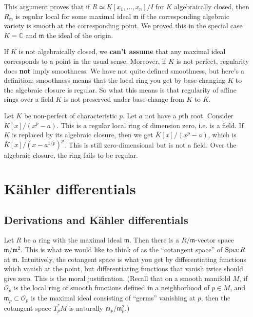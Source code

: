 \begin{remark}[Warning] This argument proves that if $R \simeq K[x_1, \dots,
x_n]/I$ for $K$ algebraically closed, then $R_{\mathfrak{m}}$ is regular local for some maximal ideal
$\mathfrak{m}$ if the corresponding algebraic variety is smooth at the
corresponding point. We proved this in the special case $K  = \mathbb{C}$ and
$\mathfrak{m}$ the ideal of the origin.

If $K$ is not algebraically closed, we \textbf{can't assume} that any maximal
ideal corresponds to a point in the usual sense. Moreover, if $K$ is not
perfect, regularity does \textbf{not} imply smoothness. We have not quite
defined smoothness, but here's a definition: smoothness means that the local
ring you get by base-changing $K$ to the algebraic closure is regular. So what
this means is that 
regularity of affine rings over a field $K$ is not preserved under
base-change from $K$ to $\overline{K}$. 
\end{remark} 

\begin{example} Let $K$ be non-perfect of characteristic $p$. Let $a$ not have
a $p$th root.
Consider $K[x]/(x^p -a)$. This is a regular local ring of dimension zero, i.e.
is a field. If $K$ is replaced by its algebraic closure, then we get
$\overline{K}[x]/(x^p - a)$, which is $\overline{K}[x]/(x- a^{1/p})^p$. This is
still zero-dimensional but is not a field. Over the algebraic closure, the ring
fails to be regular.
\end{example} 




\section{K\"ahler differentials}
\subsection{Derivations and K\"ahler differentials} Let $R$ be a ring with the maximal ideal
$\mathfrak{m}$. Then there is a $R/\mathfrak{m}$-vector space
$\mathfrak{m}/\mathfrak{m}^2$. This is what we would like to think of as the
``{cotangent space}'' of $\operatorname{Spec} R$ at $\mathfrak{m}$. Intuitively, the
cotangent space is what you get by differentiating functions which vanish at
the point, but
differentiating functions that vanish twice should give zero. This is the moral
justification.
(Recall that on a smooth manifold $M$, if $\mathcal{O}_p$ is the local ring of
smooth functions defined in a neighborhood of $p \in M$, and $\mathfrak{m}_p
\subset \mathcal{O}_p$ is the maximal ideal consisting of ``germs'' vanishing
at $p$, then the cotangent space $T_p^* M$ is naturally
$\mathfrak{m}_p/\mathfrak{m}_p^2$.)

